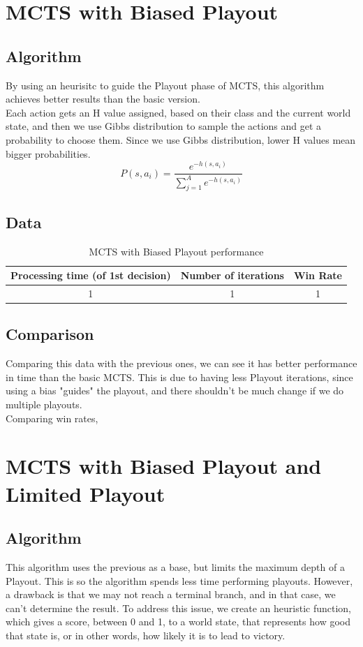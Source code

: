 \documentclass{article}
\begin{document}
  \section{MCTS with Biased Playout}
  \subsection{Algorithm}
  By using an heurisitc to guide the Playout phase of MCTS, this algorithm achieves better results than the basic version.\\
  Each action gets an H value assigned, based on their class and the current world state, and then we use Gibbs distribution to sample the actions and get a probability to choose them. 
  Since we use Gibbs distribution, lower H values mean bigger probabilities.\\
  \[P(s,a_i) = \frac{e^{-h(s, a_i)}}{\sum_{j=1}^{A}e^{-h(s, a_i)}}\]
  
  \subsection{Data}
  \begin{table}[h!]
    \centering
    \caption{MCTS with Biased Playout performance}
    \label{tab:tableBiasedMCTS1}
    \begin{tabular}{c|c|c}
      \textbf{Processing time (of 1st decision)} & \textbf{Number of iterations} & \textbf{Win Rate}\\
      \hline
      1 & 1 & 1
    \end{tabular}
  \end{table}

  \subsection{Comparison}
  Comparing this data with the previous ones, we can see it has better performance in time than the basic MCTS. This is due to having less Playout iterations,
  since using a bias "guides" the playout, and there shouldn't be much change if we do multiple playouts.\\
  Comparing win rates,

  \section{MCTS with Biased Playout and Limited Playout}

  \subsection{Algorithm}
  This algorithm uses the previous as a base, but limits the maximum depth of a Playout. This is so the algorithm spends less time performing playouts. However,
  a drawback is that we may not reach a terminal branch, and in that case, we can't determine the result. To address this issue, we create an heuristic function,
  which gives a score, between 0 and 1, to a world state, that represents how good that state is, or in other words, how likely it is to lead to victory.
  
\end{document}
